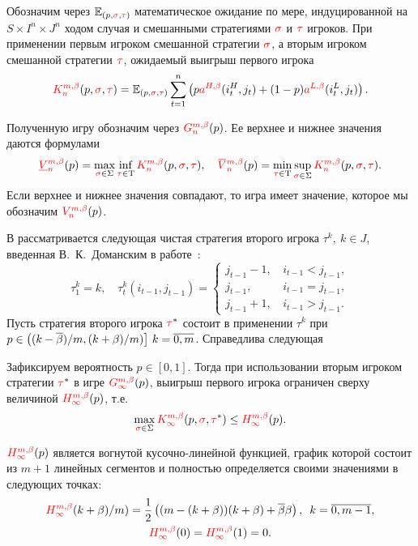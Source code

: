 Обозначим через $\operatorname{\mathbb{E}}_{(p,\textcolor{red}{\sigma},\textcolor{red}{\tau})}$ математическое ожидание по мере, индуцированной на $S \times I^n \times J^n$ ходом случая и смешанными стратегиями $\textcolor{red}{\sigma}$ и $\textcolor{red}{\tau}$ игроков.
При применении первым игроком смешанной стратегии $\textcolor{red}{\sigma}$, а вторым игроком смешанной стратегии $\textcolor{red}{\tau}$, ожидаемый выигрыш первого игрока
\begin{equation}
  \label{ch1:eq:firstPlayerPayoff}
  \K*{n}(p, \sigmar, \taur) = \E_{(p,\sigmar,\taur)} \sum_{t=1}^n
  \left(
    p \as[H](i_t^H, j_t) + (1 - p)\as[L](i_t^L, j_t)
  \right).
\end{equation}

Полученную игру обозначим через $\theG*{n}(p)$.
Ее верхнее и нижнее значения даются формулами
\begin{equation*}
  \LowV*{n}(p) = \max_{\sigmar \in \Sigma} \inf_{\taur \in \Tau}
  \K*{n}(p, \sigmar, \taur), \quad
  \HighV*{n}(p) = \min_{\taur \in \Tau} \sup_{\sigmar \in \Sigma}
  \K*{n}(p, \sigmar, \taur).
\end{equation*}
Если верхнее и нижнее значения совпадают, то игра имеет значение, которое мы обозначим $\V*{n}(p)$.

В  рассматривается следующая чистая стратегия второго игрока $\tau^k,\ k \in J$, введенная В.~К.~Доманским в работе~\cite{domansky07}:
\[
  \tau^k_1 = k, \quad \tau^k_t(i_{t-1}, j_{t-1}) = \begin{cases}
    j_{t-1} - 1, & \, i_{t-1} < j_{t-1}, \\
    j_{t-1},     & \, i_{t-1} = j_{t-1}, \\
    j_{t-1} + 1, & \, i_{t-1} > j_{t-1}.
  \end{cases}
\]
Пусть стратегия второго игрока $\textcolor{red}{\tau}^*$ состоит в применении $\tau^k$ при $p \in \left( (k-{{\overline{\beta}}})/m, (k+\beta)/m) \right]\, k = \overline{0, m}$.
Справедлива следующая
\begin{theorem}
  Зафиксируем вероятность $p \in [0,1]$.
  Тогда при использовании вторым игроком стратегии $\textcolor{red}{\tau}^*$ в игре $\theG*{\infty}(p)$\textup{,} выигрыш первого игрока ограничен сверху величиной $\H*{\infty}(p)$, т.е.
  \[ 
    \max_{\sigmar \in \Sigma} \K*{\infty}(p, \sigmar, \taur^*) \leq \H*{\infty}(p).
  \]

  $\H*{\infty}(p)$ является вогнутой кусочно-линейной функцией, график которой состоит из $m+1$ линейных сегментов и полностью определяется своими значениями в следующих точках:
  \begin{gather*}
    \H*{\infty}(k+\Co)/m) = \frac{1}{2} \left( (m - (k + \Co))(k + \Co) + \DCo\Co \right),\enskip
    k = \overline{0, m - 1},\\
    \H*{\infty}(0) = \H*{\infty}(1) = 0.
  \end{gather*}
\end{theorem}

